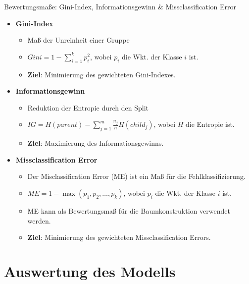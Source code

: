 \documentclass{beamer}
\begin{document}
\begin{frame}{Bewertungsmaße: Gini-Index, Informationsgewinn \& Missclassification Error}
	\begin{itemize}
		\item{\textbf{Gini-Index}}
		\begin{itemize}
			\item Maß der Unreinheit einer Gruppe
			\item $Gini = 1 - \sum_{i=1}^k p_i^2$, wobei $p_i$ die Wkt. der Klasse $i$ ist.
			\item \textbf{Ziel}: Minimierung des gewichteten Gini-Indexes.
		\end{itemize}
		\item{\textbf{Informationsgewinn}}
		\begin{itemize}
			\item Reduktion der Entropie durch den Split
			\item $IG = H(parent) - \sum_{j=1}^m \frac{n_j}{n} H(child_j)$, wobei $H$ die Entropie ist.
			\item \textbf{Ziel}: Maximierung des Informationsgewinns.
		\end{itemize}
		\item{\textbf{Missclassification Error}}
		\begin{itemize}
			\item {Der Misclassification Error (ME) ist ein Maß für die Fehlklassifizierung.}
			\item {$ME = 1 - \max(p_1, p_2, \dots, p_k)$, wobei $p_i$ die Wkt. der Klasse $i$ ist.}
			\item {ME kann als Bewertungsmaß für die Baumkonstruktion verwendet werden.}
			\item {\textbf{Ziel}: Minimierung des gewichteten Missclassification Errors.}
		\end{itemize}
	\end{itemize}
\end{frame}


\section{Auswertung des Modells}
\end{document}
